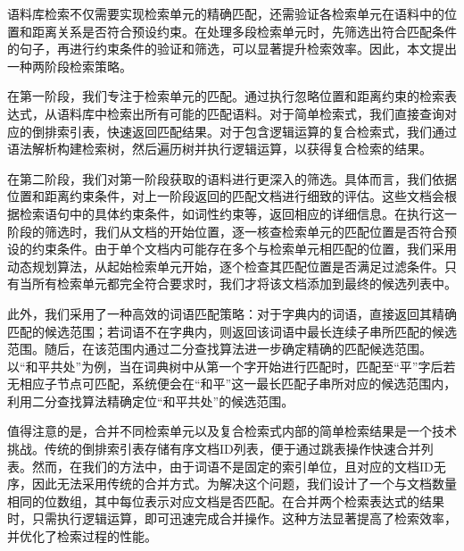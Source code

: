 \documentclass[11pt]{article}
\begin{document}
\begin{CJK*}{UTF8}{gbsn}
语料库检索不仅需要实现检索单元的精确匹配，还需验证各检索单元在语料中的位置和距离关系是否符合预设约束。在处理多段检索单元时，先筛选出符合匹配条件的句子，再进行约束条件的验证和筛选，可以显著提升检索效率。因此，本文提出一种两阶段检索策略。

在第一阶段，我们专注于检索单元的匹配。通过执行忽略位置和距离约束的检索表达式，从语料库中检索出所有可能的匹配语料。对于简单检索式，我们直接查询对应的倒排索引表，快速返回匹配结果。对于包含逻辑运算的复合检索式，我们通过语法解析构建检索树，然后遍历树并执行逻辑运算，以获得复合检索的结果。

在第二阶段，我们对第一阶段获取的语料进行更深入的筛选。具体而言，我们依据位置和距离约束条件，对上一阶段返回的匹配文档进行细致的评估。这些文档会根据检索语句中的具体约束条件，如词性约束等，返回相应的详细信息。在执行这一阶段的筛选时，我们从文档的开始位置，逐一核查检索单元的匹配位置是否符合预设的约束条件。由于单个文档内可能存在多个与检索单元相匹配的位置，我们采用动态规划算法，从起始检索单元开始，逐个检查其匹配位置是否满足过滤条件。只有当所有检索单元都完全符合要求时，我们才将该文档添加到最终的候选列表中。

此外，我们采用了一种高效的词语匹配策略：对于字典内的词语，直接返回其精确匹配的候选范围；若词语不在字典内，则返回该词语中最长连续子串所匹配的候选范围。随后，在该范围内通过二分查找算法进一步确定精确的匹配候选范围。以“和平共处”为例，当在词典树中从第一个字开始进行匹配时，匹配至“平”字后若无相应子节点可匹配，系统便会在“和平”这一最长匹配子串所对应的候选范围内，利用二分查找算法精确定位“和平共处”的候选范围。

值得注意的是，合并不同检索单元以及复合检索式内部的简单检索结果是一个技术挑战。传统的倒排索引表存储有序文档ID列表，便于通过跳表操作快速合并列表。然而，在我们的方法中，由于词语不是固定的索引单位，且对应的文档ID无序，因此无法采用传统的合并方式。为解决这个问题，我们设计了一个与文档数量相同的位数组，其中每位表示对应文档是否匹配。在合并两个检索表达式的结果时，只需执行逻辑运算，即可迅速完成合并操作。这种方法显著提高了检索效率，并优化了检索过程的性能。

%	
%		
%	
%		
%	



\end{CJK*}
\end{document}
